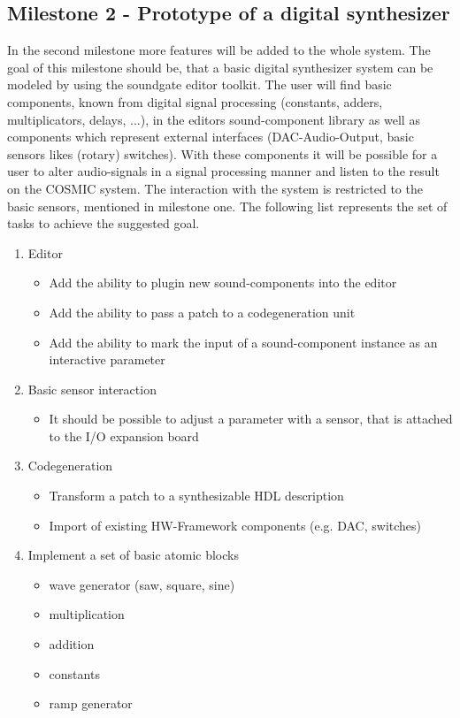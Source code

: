 \subsection{Milestone 2 - Prototype of a digital synthesizer}

In the second milestone more features will be added to the whole system. 
The goal of this milestone should be, that a basic digital synthesizer system can be modeled by using the soundgate editor toolkit. 
The user will find basic components, known from digital signal processing (constants, adders, multiplicators, delays, ...), in the editors sound-component library as well as components which represent external interfaces (DAC-Audio-Output, basic sensors likes (rotary) switches).
 With these components it will be possible for a user to alter audio-signals in a signal processing manner and listen to the result on the \ac{COSMIC} system. 
 The interaction with the system is restricted to the basic sensors, mentioned in milestone one. The following list represents the set of tasks to achieve the suggested goal.

	\begin{enumerate}
		\item Editor
			\begin{itemize}
				\item Add the ability to plugin new sound-components into the editor
				\item Add the ability to pass a patch to a codegeneration unit
				\item Add the ability to mark the input of a sound-component instance as an interactive parameter
			\end{itemize}
		\item Basic sensor interaction
			\begin{itemize}
				\item It should be possible to adjust a parameter with a sensor, that is attached to the I/O expansion board
			\end{itemize}
		\item Codegeneration	
			\begin{itemize}
				\item Transform a patch to a synthesizable HDL description
				\item Import of existing HW-Framework components (e.g. \ac{DAC}, switches)
			\end{itemize}
		\item Implement a set of basic atomic blocks
			\begin{itemize}
				\item wave generator (saw, square, sine)
				\item multiplication
				\item addition
				\item constants
				\item ramp generator
			\end{itemize}
	\end{enumerate}

